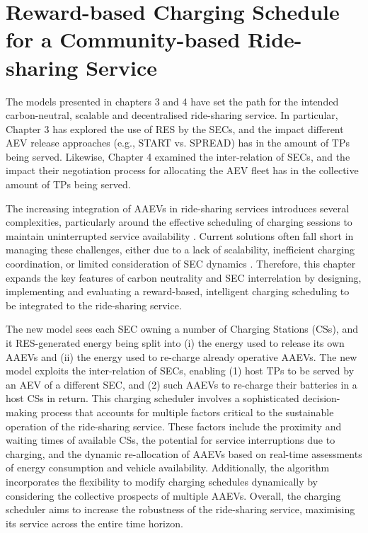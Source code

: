\chapter{Reward-based Charging Schedule for a Community-based Ride-sharing Service}
\label{chapter5}

The models presented in chapters 3 and 4 have set the path for the intended carbon-neutral, scalable and decentralised ride-sharing service. In particular, Chapter 3 has explored the use of RES by the SECs, and the impact different AEV release approaches (e.g., START vs. SPREAD) has in the amount of TPs being served. Likewise, Chapter 4 examined the inter-relation of SECs, and the impact their negotiation process for allocating the AEV fleet has in the collective amount of TPs being served. 

The increasing integration of AAEVs in ride-sharing services introduces several complexities, particularly around the effective scheduling of charging sessions to maintain uninterrupted service availability \cite{energydatamanagement}. Current solutions often fall short in managing these challenges, either due to a lack of scalability, inefficient charging coordination, or limited consideration of SEC dynamics \cite{boasso2021sec}. Therefore, this chapter expands the key features of carbon neutrality and SEC interrelation by designing, implementing and evaluating a reward-based, intelligent charging scheduling to be integrated to the ride-sharing service. 

The new model sees each SEC owning a number of Charging Stations (CSs), and it RES-generated energy being split into (i) the energy used to release its own AAEVs and (ii) the energy used to re-charge already operative AAEVs. The new model exploits the inter-relation of SECs, enabling (1) host TPs to be served by an AEV of a different SEC, and (2) such AAEVs to re-charge their batteries in a host CSs in return. This charging scheduler involves a sophisticated decision-making process that accounts for multiple factors critical to the sustainable operation of the ride-sharing service. These factors include the proximity and waiting times of available CSs, the potential for service interruptions due to charging, and the dynamic re-allocation of AAEVs based on real-time assessments of energy consumption and vehicle availability. Additionally, the algorithm incorporates the flexibility to modify charging schedules dynamically by considering the collective prospects of multiple AAEVs. Overall, the charging scheduler aims to increase the robustness of the ride-sharing service, maximising its service across the entire time horizon. 

